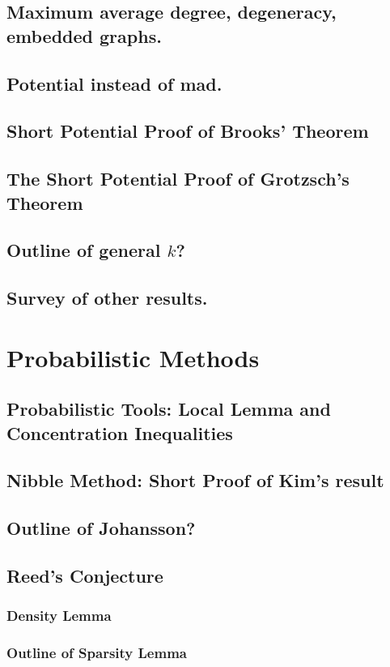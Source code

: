 \documentclass[12pt,twoside,openright,a4paper]{book}
\begin{document}

\section{Maximum average degree, degeneracy, embedded graphs.}
\section{Potential instead of mad.}
\section{Short Potential Proof of Brooks' Theorem}
\section{The Short Potential Proof of Grotzsch's Theorem}
\section{Outline of general $k$?}
\section{Survey of other results.}

\chapter{Probabilistic Methods}
\section{Probabilistic Tools: Local Lemma and Concentration Inequalities}
\section{Nibble Method: Short Proof of Kim's result}
\section{Outline of Johansson?}
\section{Reed's Conjecture}
\subsection{Density Lemma}
\subsection{Outline of Sparsity Lemma}
\end{document}
